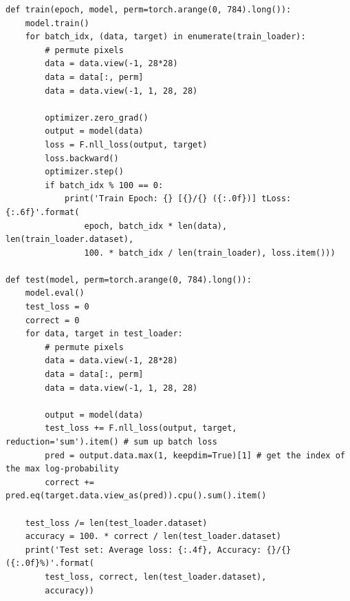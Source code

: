         \begin{verbatim}
def train(epoch, model, perm=torch.arange(0, 784).long()):
    model.train()
    for batch_idx, (data, target) in enumerate(train_loader):
        # permute pixels
        data = data.view(-1, 28*28)
        data = data[:, perm]
        data = data.view(-1, 1, 28, 28)

        optimizer.zero_grad()
        output = model(data)
        loss = F.nll_loss(output, target)
        loss.backward()
        optimizer.step()
        if batch_idx % 100 == 0:
            print('Train Epoch: {} [{}/{} ({:.0f})] tLoss: {:.6f}'.format(
                epoch, batch_idx * len(data), len(train_loader.dataset),
                100. * batch_idx / len(train_loader), loss.item()))
            
def test(model, perm=torch.arange(0, 784).long()):
    model.eval()
    test_loss = 0
    correct = 0
    for data, target in test_loader:
        # permute pixels
        data = data.view(-1, 28*28)
        data = data[:, perm]
        data = data.view(-1, 1, 28, 28)
        
        output = model(data)
        test_loss += F.nll_loss(output, target, reduction='sum').item() # sum up batch loss                                               
        pred = output.data.max(1, keepdim=True)[1] # get the index of the max log-probability           
        correct += pred.eq(target.data.view_as(pred)).cpu().sum().item()

    test_loss /= len(test_loader.dataset)
    accuracy = 100. * correct / len(test_loader.dataset)
    print('Test set: Average loss: {:.4f}, Accuracy: {}/{} ({:.0f}%)'.format(
        test_loss, correct, len(test_loader.dataset),
        accuracy))
        \end{verbatim}
        
